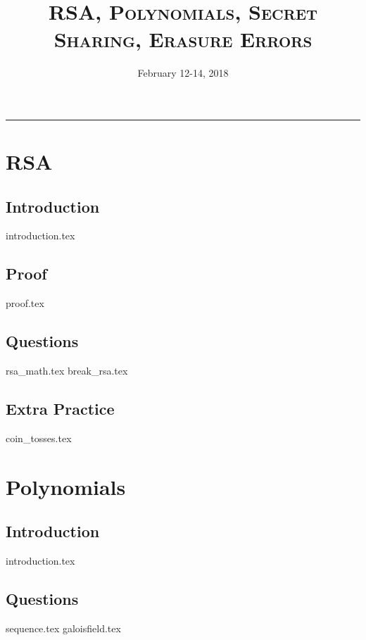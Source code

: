 \documentclass{exam}
\title{\Large \textsc{RSA, Polynomials, Secret Sharing, Erasure Errors}}
\date{February 12-14, 2018}
\begin{document}
\maketitle
\rule{\textwidth}{0.15em}
\fontsize{12}{15}\selectfont
\thispagestyle{empty}

\section{RSA}
\subsection{Introduction}
{introduction.tex}
\subsection{Proof}
{proof.tex}
\subsection{Questions}
\begin{questions}
{rsa_math.tex}
{break_rsa.tex}
\end{questions}
\subsection{Extra Practice}
\begin{questions}
{coin_tosses.tex}
\end{questions}

\section{Polynomials}
\subsection{Introduction}
{introduction.tex}
\subsection{Questions}
\begin{questions}
{sequence.tex}
{galoisfield.tex}
\end{questions}
\end{document}
